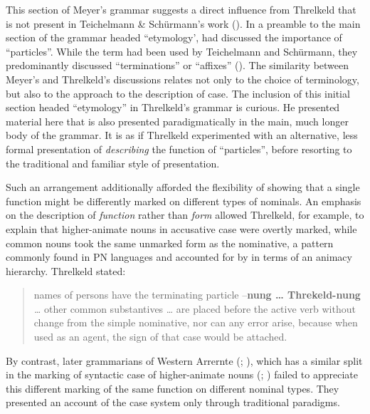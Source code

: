 This section of Meyer’s grammar suggests a direct influence from Threlkeld that is not present in Teichelmann \& Schürmann’s work (\citeyear{teichelmann_outlines_1840}). In a preamble to the main section of the grammar headed “etymology’, \citet[5--7]{Threlkeld1834} had discussed the importance of ``particles''. While the term had been used by Teichelmann and Schürmann, they predominantly discussed “terminations” or “affixes” (\citeyear[3]{teichelmann_outlines_1840}). The similarity between Meyer’s and Threlkeld’s discussions relates not only to the choice of terminology, but also to the approach to the description of case. The inclusion of this initial section headed “etymology” in Threlkeld’s grammar is curious. He presented material here that is also presented paradigmatically in the main, much longer body of the grammar. It is as if Threlkeld experimented with an alternative, less formal presentation of \textit{describing} the function of ``particles'', before resorting to the traditional and familiar style of presentation.

Such an arrangement additionally afforded the flexibility of showing that a single function might be differently marked on different types of nominals. An emphasis on the description of \textit{function} rather than \textit{form} allowed Threlkeld, for example, to explain that higher-animate nouns in accusative case were overtly marked, while common nouns took the same unmarked form as the nominative, a pattern commonly found in PN languages \citep[14]{Blake1977} and accounted for by \citet{Silverstein1976} in terms of an animacy hierarchy. Threlkeld stated:

\begin{quote}
names of persons have the terminating particle –\textbf{nung … Threkeld-nung} \textit{…} other common substantives … are placed before the active verb without change from the simple nominative, nor can any error arise, because when used as an agent, the sign of that case would be attached. \citep[6--7]{threlkeld_australian_1834}
\end{quote}

By contrast, later grammarians of Western Arrernte (\citealt{kempe_grammar_1891}; \citealt{mathews_arranda_1907}), which has a similar split in the marking of syntactic case of higher-animate nouns (\citealt{Stockigt2017}; ) failed to appreciate this different marking of the same function on different nominal types. They presented an account of the case system only through traditional paradigms.

